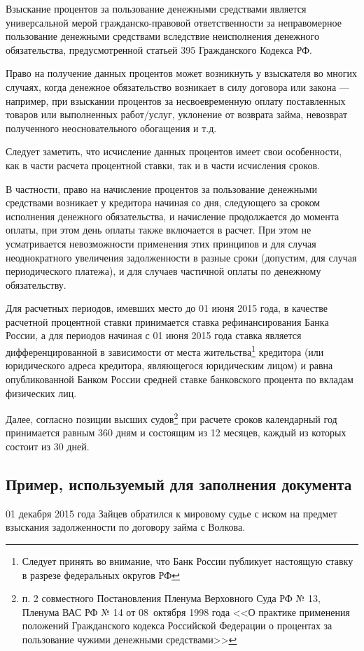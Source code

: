 \documentclass[a4paper,12pt,draft]{article}
\begin{document}
Взыскание процентов за пользование денежными средствами является универсальной мерой гражданско-правовой ответственности за неправомерное пользование денежными средствами вследствие неисполнения денежного обязательства, предусмотренной статьей 395 Гражданского Кодекса РФ.

Право на получение данных процентов может возникнуть у взыскателя во многих случаях, когда денежное обязательство возникает в силу договора или закона --- например, при взыскании процентов за несвоевременную оплату поставленных товаров или выполненных работ/услуг, уклонение от возврата займа, невозврат полученного неосновательного обогащения и т.д.

Следует заметить, что исчисление данных процентов имеет свои особенности, как в части расчета процентной ставки, так и в части исчисления сроков.

В частности, право на начисление процентов за пользование денежными средствами возникает у кредитора начиная со дня, следующего за сроком исполнения денежного обязательства, и начисление продолжается до момента оплаты, при этом день оплаты также включается в расчет. При этом не усматривается невозможности применения этих принципов и для случая неоднократного увеличения задолженности в разные сроки (допустим, для случая периодического платежа), и для случаев частичной оплаты по денежному обязательству.

Для расчетных периодов, имевших место до 01 июня 2015 года, в качестве расчетной процентной ставки принимается ставка рефинансирования Банка России, а для периодов начиная с 01 июня 2015 года ставка является дифференцированной в зависимости от места жительства\footnote{Следует принять во внимание, что Банк России публикует настоящую ставку в разрезе федеральных округов РФ} кредитора (или юридического адреса кредитора, являющегося юридическим лицом) и равна опубликованной Банком России средней ставке банковского процента по вкладам физических лиц.

Далее, согласно позиции высших судов\footnote{п. 2 совместного Постановления Пленума Верховного Суда РФ № 13, Пленума ВАС РФ № 14 от 08~октября 1998 года <<О практике применения положений Гражданского кодекса Российской Федерации о процентах за пользование чужими денежными средствами>>} при расчете сроков календарный год принимается равным 360 дням и состоящим из 12 месяцев, каждый из которых состоит из 30 дней.

\subsection{Пример, используемый для заполнения документа}
01 декабря 2015 года Зайцев обратился к мировому судье с иском на предмет взыскания задолженности по договору займа с Волкова.
\end{document}
